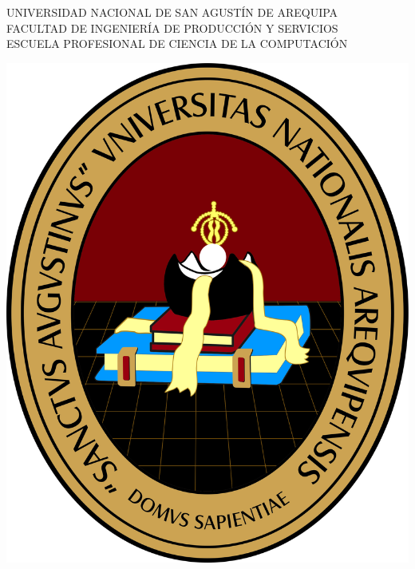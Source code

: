 \newpage
\thispagestyle{empty}
\begin{doublespacing}       
    \begin{center}
 \Large\uppercase\expandafter{UNIVERSIDAD NACIONAL DE SAN AGUSTÍN DE AREQUIPA}\\
        \large\uppercase\expandafter{FACULTAD DE INGENIERÍA DE PRODUCCIÓN Y SERVICIOS}\\
        \normalsize\uppercase\expandafter{ESCUELA PROFESIONAL DE CIENCIA DE LA COMPUTACIÓN}\\
    \end{center}
\end{doublespacing}
     \null\vskip0.16in
      \begin{center}
         \includegraphics[scale=0.29]{ESCUDO.jpg}
      \end{center}

